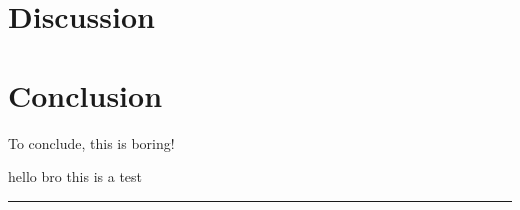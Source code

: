 \documentclass[5p,sort&compress]{elsarticle}
\begin{document}
\section{Discussion}


\section{Conclusion}

\noindent To conclude, this is boring!


hello bro this is a test




\begingroup
\begin{center}
  \rule{2cm}{.4pt}
\end{center}
\makeatletter
{}
\makeatother



\endgroup
\end{document}
